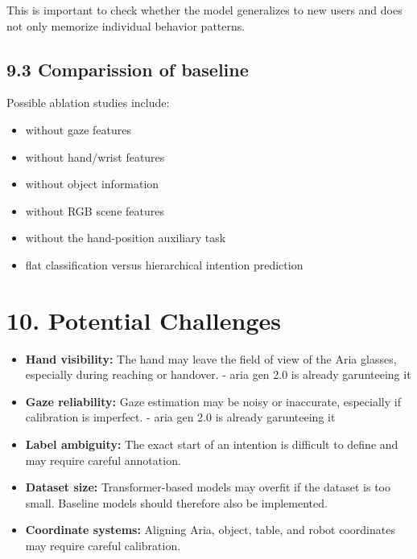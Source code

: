 \documentclass[11pt,a4paper]{article}
\begin{document}
This is important to check whether the model generalizes to new users and does not only memorize individual behavior patterns.

\subsection*{9.3 Comparission of baseline}

Possible ablation studies include:

\begin{itemize}
    \item without gaze features
    \item without hand/wrist features
    \item without object information
    \item without RGB scene features
    \item without the hand-position auxiliary task
    \item flat classification versus hierarchical intention prediction
\end{itemize}

\section*{10. Potential Challenges}

\begin{itemize}
    \item \textbf{Hand visibility:} The hand may leave the field of view of the Aria glasses, especially during reaching or handover. - aria gen 2.0 is already garunteeing it
    
    \item \textbf{Gaze reliability:} Gaze estimation may be noisy or inaccurate, especially if calibration is imperfect. - aria gen 2.0 is already garunteeing it
    
    \item \textbf{Label ambiguity:} The exact start of an intention is difficult to define and may require careful annotation.
    
    \item \textbf{Dataset size:} Transformer-based models may overfit if the dataset is too small. Baseline models should therefore also be implemented.
    
    \item \textbf{Coordinate systems:} Aligning Aria, object, table, and robot coordinates may require careful calibration.
    
\end{itemize}
\end{document}
